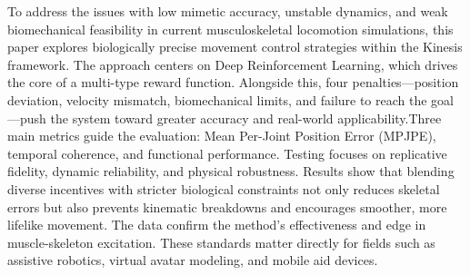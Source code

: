 \begin{abstracten}

To address the issues with low mimetic accuracy, unstable dynamics, and
weak biomechanical feasibility in current musculoskeletal locomotion
simulations, this paper explores biologically precise movement control
strategies within the Kinesis framework. The approach centers on Deep
Reinforcement Learning, which drives the core of a multi-type reward
function. Alongside this, four penalties—position deviation, velocity
mismatch, biomechanical limits, and failure to reach the goal—push the
system toward greater accuracy and real-world applicability.Three main
metrics guide the evaluation: Mean Per-Joint Position Error (MPJPE),
temporal coherence, and functional performance. Testing focuses on
replicative fidelity, dynamic reliability, and physical robustness.
Results show that blending diverse incentives with stricter biological
constraints not only reduces skeletal errors but also prevents kinematic
breakdowns and encourages smoother, more lifelike movement. The data
confirm the method's effectiveness and edge in muscle-skeleton
excitation. These standards matter directly for fields such as assistive
robotics, virtual avatar modeling, and mobile aid devices.

\end{abstracten}
